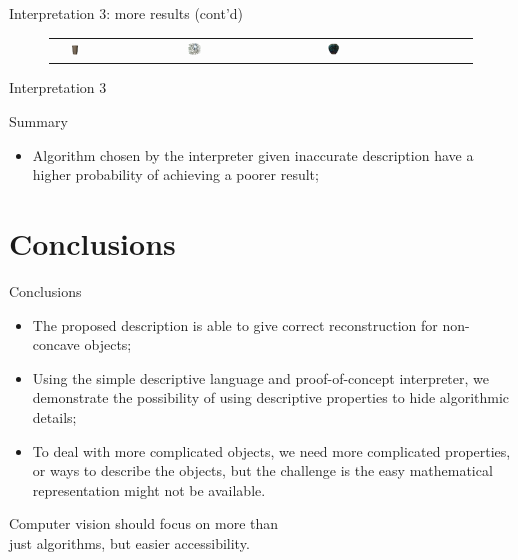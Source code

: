 \documentclass[10pt]{beamer}
\begin{document}
\begin{frame}{Interpretation 3: more results (cont'd)}
\begin{figure}
\begin{tabular}{c*{4}{l}}
& \includegraphics[width=0.1\textwidth]{interp/real_interp/cup/cup_ps}
& \includegraphics[width=0.1\textwidth]{interp/real_interp/pot/pot_sl}
& \includegraphics[width=0.1\textwidth]{interp/real_interp/vase/vase_mvs} \\
\end{tabular}
\end{figure}

\end{frame}

\begin{frame}{Interpretation 3}

\begin{exampleblock}{Summary}
\begin{itemize}
\item Algorithm chosen by the interpreter given inaccurate description have a higher probability of achieving a poorer result; \\
\end{itemize}
\end{exampleblock}

\end{frame}

\section{Conclusions}
\begin{frame}{Conclusions}

\begin{itemize}
\item The proposed description is able to give correct reconstruction for non-concave objects;
\item Using the simple descriptive language and proof-of-concept interpreter, we demonstrate the possibility of using descriptive properties to hide algorithmic details;
\item To deal with more complicated objects, we need more complicated properties, or ways to describe the objects, but the challenge is the easy mathematical representation might not be available.
\end{itemize}
\end{frame}

\begin{frame}[standout]

Computer vision should focus on more than \\just algorithms, but easier accessibility.

\end{frame}
\end{document}
